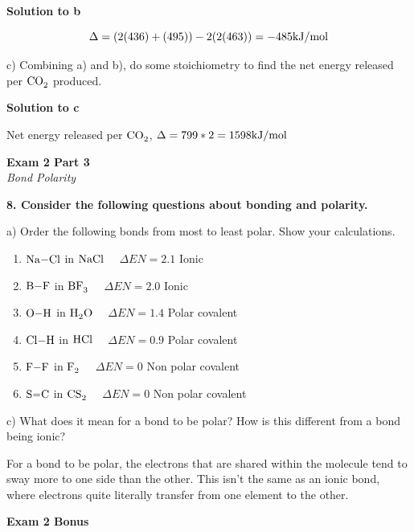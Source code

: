 \documentclass{article}
\begin{document}
    \textbf{Solution to b}

    $$\Delta = (2(436) + (495)) - 2(2(463))  = -485 \si[per-mode=symbol]{\kilo\joule\per\mole}$$

    c) Combining a) and b), do some stoichiometry to find the net energy released per $\ce{CO2}$ produced.

    \textbf{Solution to c}

    Net energy released per $\ce{CO2}$, $\Delta = 799 * 2 = 1598 \si[per-mode=symbol]{\kilo\joule\per\mole}$

    \pagebreak

    \begin{center}
        \textbf{Exam 2 Part 3}\\
        \textit{Bond Polarity}
    \end{center}
    \textbf{8. Consider the following questions about bonding and polarity.}

    a) Order the following bonds from most to least polar. Show your calculations.
    \begin{enumerate}
        \item $\ce{Na-Cl}$ in $\ce{NaCl}$ $\quad \Delta EN = 2.1$ Ionic
        \item $\ce{B-F}$ in $\ce{BF3}$ $\quad \Delta EN = 2.0$ Ionic
        \item $\ce{O-H}$ in $\ce{H2O}$ $\quad \Delta EN = 1.4$ Polar covalent
        \item $\ce{Cl-H}$ in $\ce{HCl}$ $\quad \Delta EN = 0.9$ Polar covalent
        \item $\ce{F-F}$ in $\ce{F2}$ $\quad \Delta EN = 0$ Non polar covalent
        \item $\ce{S=C}$ in $\ce{CS2}$ $\quad \Delta EN = 0$ Non polar covalent
    \end{enumerate}

    c) What does it mean for a bond to be polar? How is this different from a bond being ionic?

    For a bond to be polar, the electrons that are shared within the molecule tend to sway more to one side than the other. This isn't the same as an ionic bond, where electrons quite literally transfer from one element to the other.
    \pagebreak

    \begin{center}
        \textbf{Exam 2 Bonus}\\
    \end{center}
\end{document}

